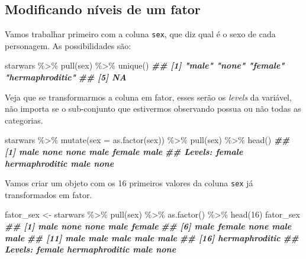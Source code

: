 \documentclass[
]{book}
\newenvironment{Shaded}{\begin{snugshade}}{\end{snugshade}}
\newcommand{\AttributeTok}[1]{\textcolor[rgb]{0.77,0.63,0.00}{#1}}
\newcommand{\DecValTok}[1]{\textcolor[rgb]{0.00,0.00,0.81}{#1}}
\newcommand{\DocumentationTok}[1]{\textcolor[rgb]{0.56,0.35,0.01}{\textbf{\textit{#1}}}}
\newcommand{\FunctionTok}[1]{\textcolor[rgb]{0.00,0.00,0.00}{#1}}
\newcommand{\NormalTok}[1]{#1}
\newcommand{\OtherTok}[1]{\textcolor[rgb]{0.56,0.35,0.01}{#1}}
\newcommand{\SpecialCharTok}[1]{\textcolor[rgb]{0.00,0.00,0.00}{#1}}
\begin{document}
\hypertarget{modificando-nuxedveis-de-um-fator}{%
\subsection{Modificando níveis de um fator}\label{modificando-nuxedveis-de-um-fator}}

Vamos trabalhar primeiro com a coluna \texttt{sex}, que diz qual é o sexo de cada personagem. As possibilidades são:

\begin{Shaded}
\begin{Highlighting}[]
\NormalTok{starwars }\SpecialCharTok{\%\textgreater{}\%} 
  \FunctionTok{pull}\NormalTok{(sex) }\SpecialCharTok{\%\textgreater{}\%} 
  \FunctionTok{unique}\NormalTok{()}
\DocumentationTok{\#\# [1] "male"           "none"           "female"         "hermaphroditic"}
\DocumentationTok{\#\# [5] NA}
\end{Highlighting}
\end{Shaded}

Veja que se transformarmos a coluna em fator, esses serão os \emph{levels} da variável, não importa se o sub-conjunto que estivermos observando possua ou não todas as categorias.

\begin{Shaded}
\begin{Highlighting}[]
\NormalTok{starwars }\SpecialCharTok{\%\textgreater{}\%} 
  \FunctionTok{mutate}\NormalTok{(}\AttributeTok{sex =} \FunctionTok{as.factor}\NormalTok{(sex)) }\SpecialCharTok{\%\textgreater{}\%} 
  \FunctionTok{pull}\NormalTok{(sex) }\SpecialCharTok{\%\textgreater{}\%} 
  \FunctionTok{head}\NormalTok{()}
\DocumentationTok{\#\# [1] male   none   none   male   female male  }
\DocumentationTok{\#\# Levels: female hermaphroditic male none}
\end{Highlighting}
\end{Shaded}

Vamos criar um objeto com os 16 primeiros valores da coluna \texttt{sex} já transformados em fator.

\begin{Shaded}
\begin{Highlighting}[]
\NormalTok{fator\_sex }\OtherTok{\textless{}{-}}\NormalTok{ starwars }\SpecialCharTok{\%\textgreater{}\%} 
  \FunctionTok{pull}\NormalTok{(sex) }\SpecialCharTok{\%\textgreater{}\%} 
  \FunctionTok{as.factor}\NormalTok{() }\SpecialCharTok{\%\textgreater{}\%} 
  \FunctionTok{head}\NormalTok{(}\DecValTok{16}\NormalTok{)}
\NormalTok{fator\_sex}
\DocumentationTok{\#\#  [1] male           none           none           male           female        }
\DocumentationTok{\#\#  [6] male           female         none           male           male          }
\DocumentationTok{\#\# [11] male           male           male           male           male          }
\DocumentationTok{\#\# [16] hermaphroditic}
\DocumentationTok{\#\# Levels: female hermaphroditic male none}
\end{Highlighting}
\end{Shaded}
\end{document}
